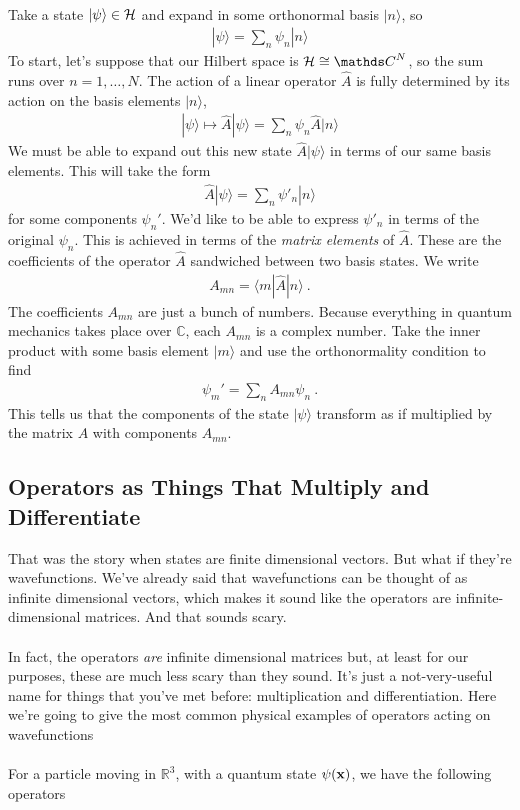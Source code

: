 \documentclass[12pt]{article}
\def\be{\begin{eqnarray}}
\def\ee{\end{eqnarray}}
\newcommand{\nn}{\nonumber}
\newcommand\para{\paragraph{}}
\newcommand{\ket}[1]{|#1\rangle}
\newcommand{\bra}[1]{\langle#1|}
\newcommand{\co}{\color{olive}}
\newcommand{\R}{{\mathds R}}
\newcommand{\C}{{\mathds C}}
\newcommand{\bx}{{\bf x}}
\begin{document}
{{\para
Take a state $\ket{\psi}\in{\cal H}$ and expand in some orthonormal basis $\ket{n}$, so 
%
\be \ket{\psi} = \sum_n\psi_n\ket{n}\nn\ee
%
To start, let's suppose that our Hilbert space is ${\cal H}\cong \C^N$, so the  sum runs over $n=1,\ldots,N$. The  action of a linear operator $\hat{A}$ is fully determined by its action on the basis elements $\ket{n}$,
%
\be \ket{\psi}\mapsto \hat{A}\ket{\psi} = \sum_n\psi_n \hat{A}\ket{n}\nn\ee
%
We must be able to expand out this new state $\hat{A}\ket{\psi}$ in terms of our same basis elements. This will take the form
%
\be \hat{A}\ket{\psi} =\sum_n\psi'_n\ket{n}\nn\ee
%
for some components $\psi_n'$. We'd like to be able to express $\psi'_n$ in terms of the original $\psi_n$. This is achieved in terms of the {\it matrix elements} of $\hat{A}$. These are the coefficients of the operator $\hat{A}$ sandwiched between two basis states. We write 
%
\be A_{mn} = \bra{m}\hat{A}\ket{n}\ .\label{matrixa}\ee
%
The coefficients $A_{mn}$ are just a bunch of numbers. Because everything in quantum mechanics takes place over $\C$, each $A_{mn}$ is  a complex number. Take the inner product  with some basis element $\ket{m}$ and  use the orthonormality condition  to find
%
\be \psi_m' = \sum_n A_{mn}\psi_n\ .\ee
%
This tells us that the components of the state $\ket{\psi}$ transform as if multiplied by the matrix $A$ with components $A_{mn}$. }


\subsection{Operators as Things That Multiply and Differentiate}

That was the story when states are finite dimensional vectors. But what if they're wavefunctions. We've already said that wavefunctions can be thought of as infinite dimensional vectors, which makes it sound like the operators are infinite-dimensional matrices. And that sounds scary. 

\para
In fact, the operators {\it are} infinite dimensional matrices but, at least for our purposes, these are much less scary than they sound. It's just a not-very-useful name for things that you've met before: multiplication and differentiation.  Here we're going to give the most common physical examples of operators acting on wavefunctions

\para
{\co For a particle moving in $\R^3$, with a quantum state $\psi(\bx)$, we have the following operators}


}
\end{document}

